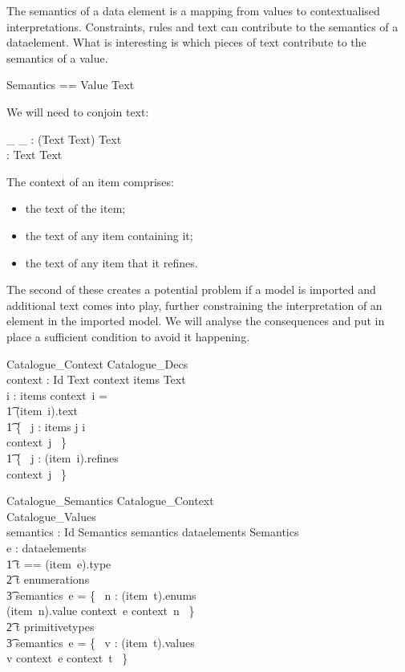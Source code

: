 \documentclass[a4paper,twoside]{article}
\def\Tand{\mathrel{\land_t}}
\def\TAnd{\mathop{\land_t}}
\def\contains{\mathrel{contains}}
\begin{document}
The semantics of a data element is a mapping from values to contextualised interpretations. Constraints, rules and text can contribute to the semantics of a dataelement. What is interesting is which pieces of text contribute to the semantics of a value. 

\begin{zed}
	Semantics == Value \pfun Text
\end{zed}

We will need to conjoin text: 
\begin{axdef}
	\_ \Tand \_ : (Text \cross Text) \fun Text \\
	\TAnd : \power Text \pfun Text 
\end{axdef}

The context of an item comprises:
\begin{itemize}
	\item the text of the item;
	\item the text of any item containing it;
	\item the text of any item that it refines. 
\end{itemize}

The second of these creates a potential problem if a model is imported and additional text comes into play, further constraining the interpretation of an element in the imported model.  We will analyse the consequences and put in place a sufficient condition to avoid it happening.

\begin{schema}{Catalogue\_Context}
	Catalogue\_Decs \\
	context : Id \pfun Text 
	\where
	context \in items \fun Text \\
	\forall i : items \spot context~i = {} \\ \t1
	(item~i).text \Tand \\ \t1
	\TAnd \{~ j : items \mid j \contains i \\ \spot context~j ~\}
	\Tand \\ \t1
	\TAnd \{~ j : (item~i).refines\\ \spot context~j ~\} 
\end{schema}

\begin{schema}{Catalogue\_Semantics}
	Catalogue\_Context \\
	Catalogue\_Values \\
	semantics : Id \pfun Semantics
	\where
	semantics \in dataelements \fun Semantics \\
	\forall e : dataelements \spot {} \\ \t1 
	\LET t == (item~e).type \spot \\ \t2 
	t \in enumerations \implies {} \\ \t3 
	semantics~e = 
	\{~ n : (item~t).enums\\ \spot 
	(item~n).value \mapsto context~e \Tand context~n ~\} 
	\land {} \\ \t2
	t \in primitivetypes \implies {} \\ \t3
	semantics~e = \{~ v : (item~t).values\\ \spot 
	v \mapsto context~e \Tand context~t ~\} 
\end{schema}
\end{document}
